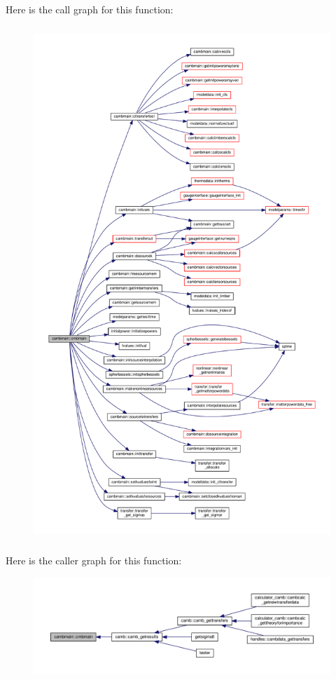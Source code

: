 Here is the call graph for this function\+:
\nopagebreak
\begin{figure}[H]
\begin{center}
\leavevmode
\includegraphics[height=550pt]{namespacecambmain_a8863977991a108f96a26fc99e8c5e129_cgraph}
\end{center}
\end{figure}
Here is the caller graph for this function\+:
\nopagebreak
\begin{figure}[H]
\begin{center}
\leavevmode
\includegraphics[width=350pt]{namespacecambmain_a8863977991a108f96a26fc99e8c5e129_icgraph}
\end{center}
\end{figure}
\mbox{\label{namespacecambmain_a66b6d740c5e702807d5454979eec8cde}} 
